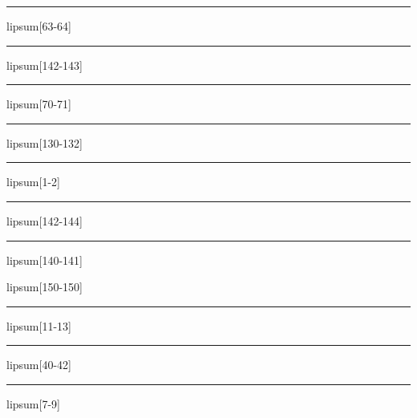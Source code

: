 \documentclass[11pt,a4paper]{article}
\begin{document}
\begin{simplewrap}
  \textcolor{cyan!26}{\rule{3.4cm}{4.8cm}}
\end{simplewrap}
lipsum[63-64]

\begin{simplewrap}
  \textcolor{cyan!38}{\rule{5.5cm}{7.6cm}}
\end{simplewrap}
lipsum[142-143]

\begin{simplewrap}
  \textcolor{orange!18}{\rule{3.8cm}{9.1cm}}
\end{simplewrap}
lipsum[70-71]

\begin{simplewrap}
  \textcolor{yellow!55}{\rule{4.0cm}{7.5cm}}
\end{simplewrap}
lipsum[130-132]

\begin{simplewrap}
  \textcolor{blue!15}{\rule{4.9cm}{8.6cm}}
\end{simplewrap}
lipsum[1-2]

\begin{simplewrap}
  \textcolor{purple!50}{\rule{5.9cm}{3.3cm}}
\end{simplewrap}
lipsum[142-144]

\begin{simplewrap}
  \textcolor{magenta!10}{\rule{3.3cm}{9.6cm}}
\end{simplewrap}
lipsum[140-141]

lipsum[150-150]

\begin{simplewrap}
  \textcolor{magenta!19}{\rule{4.3cm}{2.3cm}}
\end{simplewrap}
lipsum[11-13]

\begin{simplewrap}
  \textcolor{yellow!53}{\rule{3.7cm}{2.8cm}}
\end{simplewrap}
lipsum[40-42]

\begin{simplewrap}
  \textcolor{magenta!20}{\rule{5.9cm}{8.5cm}}
\end{simplewrap}
lipsum[7-9]
\end{document}
